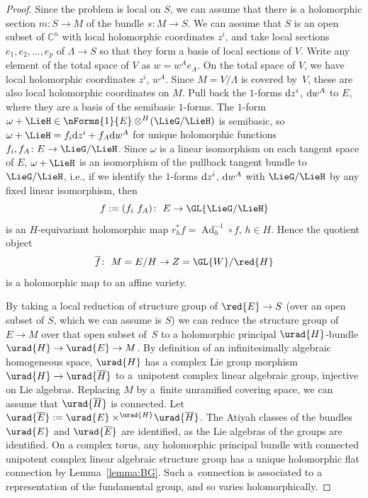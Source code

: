 \documentclass[10pt,a4paper]{amsart}
\providecommand{\C}{}
\numberwithin{equation}{section}
\renewcommand{\C}{\mathbb{C}}
\DeclareMathOperator{\Ad}{Ad}
\newcommand{\amal}[3]{\ensuremath{{#1} \mathbin{\times^{#2}} \! #3}}
\begin{document}
\begin{proof}
Since the problem is local on $S$, we can assume that there is a holomorphic section $m \colon S \to M$ of the
bundle $s \colon M \to S$.
We can assume that $S$ is an open subset of $\C^{n}$ with local holomorphic coordinates $z^i$, and take local sections $e_1, e_2,
 \dots, e_p$ of $\Lambda \to S$ so that they form a basis of local sections of $V$.
Write any element of the total space of $V$ as $w = w^Ae_A$.
On the total space of $V$, we have local holomorphic coordinates $z^i$, $w^A$.
Since $M=V/\Lambda$ is covered by~$V$, these are also local holomorphic coordinates on $M$.
Pull back the $1$-forms ${\rm d}z^i$, ${\rm d}w^A$ to $E$, where they are a basis of the semibasic $1$-forms.
The $1$-form $\omega+\LieH \in \nForms{1}{E} \otimes^H\!(\LieG/\LieH)$ is semibasic, so $\omega+\LieH = f_i {\rm d}z^i + f_A {\rm d}w^A$
for unique holomorphic functions $f_i, f_A \colon E \to \LieG/\LieH$.
Since $\omega$ is a linear isomorphism on each tangent space of $E$, $\omega+\LieH$ is an isomorphism of the pullback tangent bundle to $\LieG/\LieH$, i.e., if we identify the $1$-forms ${\rm d}z^i$, ${\rm d}w^A$ with $\LieG/\LieH$ by any fixed linear isomorphism, then
\[
f := (f_i \ f_A) \colon\ E \to \GL{\LieG/\LieH}
\]
is an $H$-equivariant holomorphic map $r_h^*f = \Ad_h^{-1} \circ f$, $h \in H$.
Hence the quotient object
\[
\overline{f} \colon\ M = E/H \to Z = \GL{W}/\red{H}
\]
is a holomorphic map to an affine variety.

By taking a local reduction of structure group of $\red{E} \to S$ (over an open subset of $S$, which we can assume is $S$) we can reduce the structure group of $E \to M$ over that open subset of~$S$ to a holomorphic principal $\urad{H}$-bundle $\urad{H} \to \urad{E} \to M$.
By definition of an infinitesimally algebraic homogeneous space, $\urad{H}$ has a complex Lie group morphism $\urad{H} \to \urad{\overline{H}}$ to a~unipotent complex linear algebraic group, injective on Lie algebras.
Replacing $M$ by a~finite unramified covering space, we can assume that $\urad{\overline{H}}$ is connected.
Let ${\urad{\overline{E}} := \amal{\urad{E}}{\urad{H}}{\urad{\overline{H}}}}$.
The Atiyah classes of the bundles $\urad{E}$ and $\urad{\overline{E}}$ are identified, as the Lie algebras of the groups are identified.
On a complex torus, any holomorphic principal bundle with connected unipotent complex linear algebraic structure group has a unique holomorphic flat connection by Lemma~\ref{lemma:BG}.
Such a~connection is associated to a representation of the fundamental group, and so varies holomorphically.
\end{proof}
\end{document}
